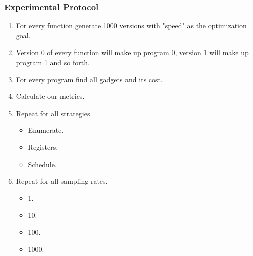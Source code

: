 \begin{frame}
	\frametitle{Experimental Protocol}

	\begin{enumerate}
		\item For every function generate 1000 versions with "speed" as the optimization goal.
		\item Version 0 of every function will make up program 0, version 1 will make up program
			1 and so forth.
		\item For every program find all gadgets and its cost.
		\item Calculate our metrics.
		\item Repeat for all strategies.
			\begin{itemize}
				\item Enumerate.
				\item Registers.
				\item Schedule.
			\end{itemize}
		\item Repeat for all sampling rates.
			\begin{itemize}
				\item 1.
				\item 10.
				\item 100.
				\item 1000.
			\end{itemize}
	\end{enumerate}

\end{frame}
